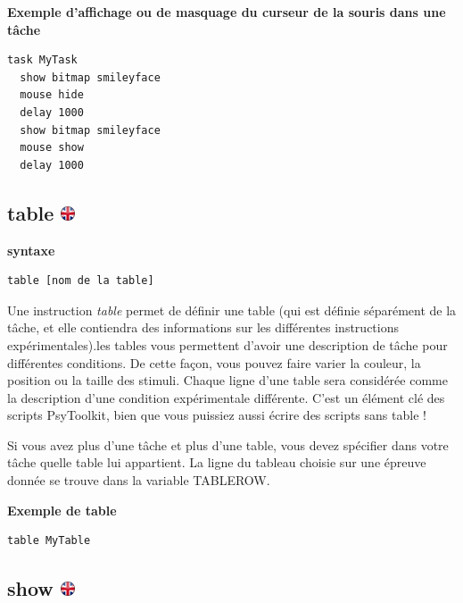 \documentclass[
]{book}
\begin{document}
\textbf{Exemple d'affichage ou de masquage du curseur de la souris dans une tâche}

\begin{verbatim}
task MyTask
  show bitmap smileyface
  mouse hide
  delay 1000
  show bitmap smileyface
  mouse show
  delay 1000
\end{verbatim}

\hypertarget{table}{%
\subsection[table ]{\texorpdfstring{table \href{https://www.psytoolkit.org/doc3.4.0/syntax.html\#table}{\protect\includegraphics{img/ukflag.png}}}{table }}\label{table}}

\textbf{syntaxe}

\begin{verbatim}
table [nom de la table]
\end{verbatim}

Une instruction \emph{table} permet de définir une table (qui est définie séparément de la tâche, et elle contiendra des informations sur les différentes instructions expérimentales).les tables vous permettent d'avoir une description de tâche pour différentes conditions. De cette façon, vous pouvez faire varier la couleur, la position ou la taille des stimuli. Chaque ligne d'une table sera considérée comme la description d'une condition expérimentale différente. C'est un élément clé des scripts PsyToolkit, bien que vous puissiez aussi écrire des scripts sans table !

Si vous avez plus d'une tâche et plus d'une table, vous devez spécifier dans votre tâche quelle table lui appartient. La ligne du tableau choisie sur une épreuve donnée se trouve dans la variable TABLEROW.

\textbf{Exemple de table}

\begin{verbatim}
table MyTable
\end{verbatim}

\hypertarget{show}{%
\subsection[show ]{\texorpdfstring{show \href{https://www.psytoolkit.org/doc3.4.0/syntax.html\#task-show}{\protect\includegraphics{img/ukflag.png}}}{show }}\label{show}}
\end{document}
